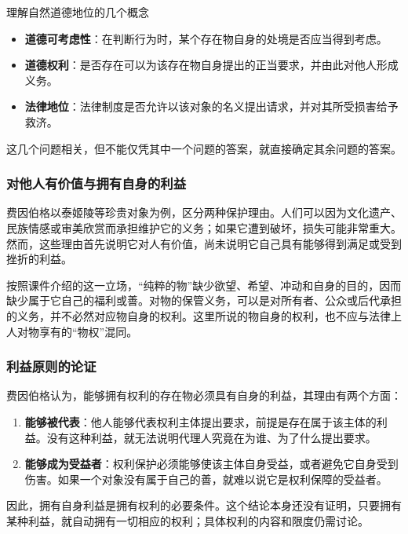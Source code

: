 \documentclass{ctexart}
\begin{document}
\begin{fancybox}{理解自然道德地位的几个概念}
    \begin{itemize}
        \item \textbf{道德可考虑性}：在判断行为时，某个存在物自身的处境是否应当得到考虑。
        \item \textbf{道德权利}：是否存在可以为该存在物自身提出的正当要求，并由此对他人形成义务。
        \item \textbf{法律地位}：法律制度是否允许以该对象的名义提出请求，并对其所受损害给予救济。
    \end{itemize}
    这几个问题相关，但不能仅凭其中一个问题的答案，就直接确定其余问题的答案。
\end{fancybox}

\subsubsection{对他人有价值与拥有自身的利益}

费因伯格以泰姬陵等珍贵对象为例，区分两种保护理由。人们可以因为文化遗产、民族情感或审美欣赏而承担维护它的义务；如果它遭到破坏，损失可能非常重大。然而，这些理由首先说明它对人有价值，尚未说明它自己具有能够得到满足或受到挫折的利益。

按照课件介绍的这一立场，“纯粹的物”缺少欲望、希望、冲动和自身的目的，因而缺少属于它自己的福利或善。对物的保管义务，可以是对所有者、公众或后代承担的义务，并不必然对应物自身的权利。这里所说的物自身的权利，也不应与法律上人对物享有的“物权”混同。

\subsubsection{利益原则的论证}

费因伯格认为，能够拥有权利的存在物必须具有自身的利益，其理由有两个方面：

\begin{enumerate}
    \item \textbf{能够被代表}：他人能够代表权利主体提出要求，前提是存在属于该主体的利益。没有这种利益，就无法说明代理人究竟在为谁、为了什么提出要求。
    \item \textbf{能够成为受益者}：权利保护必须能够使该主体自身受益，或者避免它自身受到伤害。如果一个对象没有属于自己的善，就难以说它是权利保障的受益者。
\end{enumerate}

因此，拥有自身利益是拥有权利的必要条件。这个结论本身还没有证明，只要拥有某种利益，就自动拥有一切相应的权利；具体权利的内容和限度仍需讨论。
\end{document}
